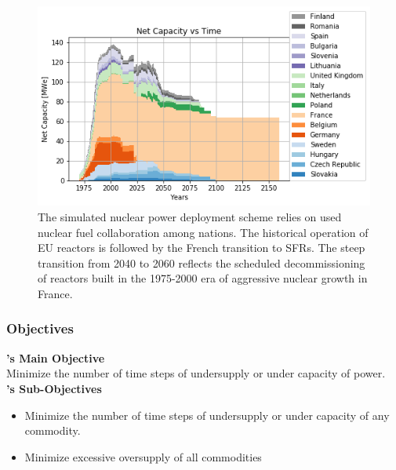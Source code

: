 \begin{frame}
\begin{figure}[htbp!]
\begin{center}
\includegraphics[width=\textwidth]{./images/onesim.png}
\end{center}
\caption{The simulated nuclear power deployment scheme relies on used
nuclear fuel collaboration among nations.
The historical operation of EU reactors is followed by the French transition to SFRs.  The steep transition from 2040 to 2060 reflects the scheduled decommissioning of reactors built in the 1975-2000 era of aggressive nuclear growth in France.}
\label{fig:tot_dep}
\end{figure}
\end{frame}

\begin{frame}
\frametitle{\deploy Objectives}
\textbf{\deploy's Main Objective}
\vspace{0.3em}
\\
Minimize the number of time steps of undersupply or under capacity 
of power.
\vspace{1em}
\\
\textbf{\deploy's Sub-Objectives}
\begin{itemize}
	\item Minimize the number of time steps of undersupply or under capacity 
	of any commodity.
	\item Minimize excessive oversupply of all commodities  
\end{itemize} 
\end{frame}

